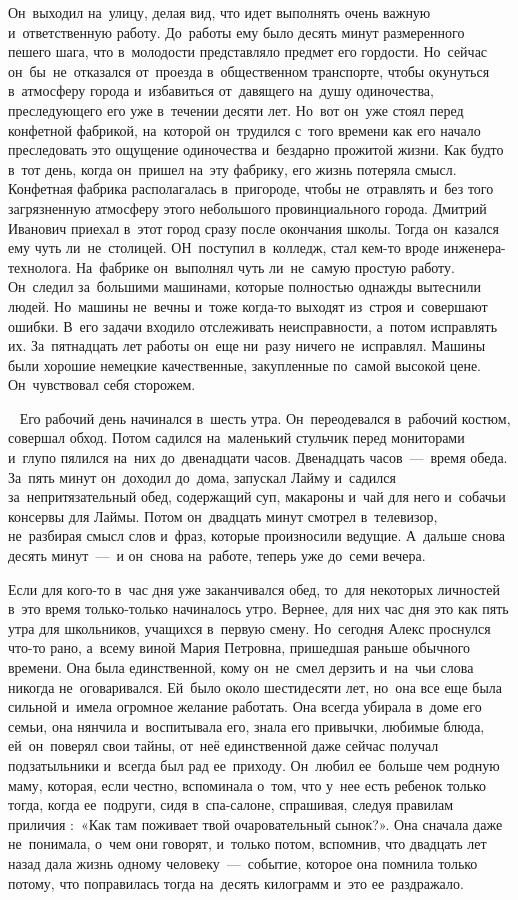 Он~выходил на~улицу, делая вид, что идет выполнять очень важную и~ответственную работу.
До~работы ему было десять минут размеренного пешего шага, что в~молодости представляло предмет его гордости.
Но~сейчас он~бы~не~отказался от~проезда в~общественном транспорте, чтобы окунуться в~атмосферу города и~избавиться от~давящего на~душу одиночества, преследующего его уже в~течении десяти лет.
Но~вот он~уже стоял перед конфетной фабрикой, на~которой он~трудился с~того времени как его начало преследовать это ощущение одиночества и~бездарно прожитой жизни.
Как будто в~тот день, когда он~пришел на~эту фабрику, его жизнь потеряла смысл.
Конфетная фабрика располагалась в~пригороде, чтобы не~отравлять и~без того загрязненную атмосферу этого небольшого провинциального города.
Дмитрий Иванович приехал в~этот город сразу после окончания школы.
Тогда он~казался ему чуть ли~не~столицей.
ОН~поступил в~колледж, стал кем-то вроде инженера-технолога.
На~фабрике он~выполнял чуть ли~не~самую простую работу.
Он~следил за~большими машинами, которые полностью однажды вытеснили людей.
Но~машины не~вечны и~тоже когда-то выходят из~строя и~совершают ошибки.
В~его задачи входило отслеживать неисправности, а~потом исправлять их.
За~пятнадцать лет работы он~еще ни~разу ничего не~исправлял.
Машины были хорошие немецкие качественные, закупленные по~самой высокой цене.
Он~чувствовал себя сторожем.

~
Его рабочий день начинался в~шесть утра.
Он~переодевался в~рабочий костюм, совершал обход.
Потом садился на~маленький стульчик перед мониторами и~глупо пялился на~них до~двенадцати часов.
Двенадцать часов~---~время обеда.
За~пять минут он~доходил до~дома, запускал Лайму и~садился за~непритязательный обед, содержащий суп, макароны и~чай для него и~собачьи консервы для Лаймы.
Потом он~двадцать минут смотрел в~телевизор, не~разбирая смысл слов и~фраз, которые произносили ведущие.
А~дальше снова десять минут~---~и он~снова на~работе, теперь уже до~семи вечера.
 
Если для кого-то в~час дня уже заканчивался обед, то~для некоторых личностей в~это время только-только начиналось утро.
Вернее, для них час дня это как пять утра для школьников, учащихся в~первую смену.
Но~сегодня Алекс проснулся что-то рано, а~всему виной Мария Петровна, пришедшая раньше обычного времени.
Она была единственной, кому он~не~смел дерзить и~на~чьи слова никогда не~оговаривался.
Ей~было около шестидесяти лет, но~она все еще была сильной и~имела огромное желание работать.
Она всегда убирала в~доме его семьи, она нянчила и~воспитывала его, знала его привычки, любимые блюда, ей~он~поверял свои тайны, от~неё единственной даже сейчас получал подзатыльники и~всегда был рад ее~приходу.
Он~любил ее~больше чем родную маму, которая, если честно, вспоминала о~том, что у~нее есть ребенок только тогда, когда ее~подруги, сидя в~спа-салоне, спрашивая, следуя правилам приличия :~«Как там поживает твой очаровательный сынок?».
Она сначала даже не~понимала, о~чем они говорят, и~только потом, вспомнив, что двадцать лет назад дала жизнь одному человеку~---~событие, которое она помнила только потому, что поправилась тогда на~десять килограмм и~это ее~раздражало.

